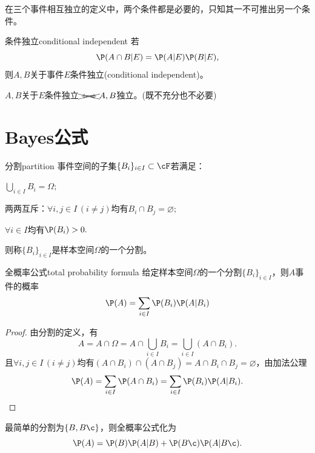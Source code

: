 \begin{remark}
	在三个事件相互独立的定义中，两个条件都是必要的，只知其一不可推出另一个条件。
\end{remark}


\begin{definition}{条件独立}{conditional independent}
	若
	\[
		\P(A\cap B|E)=\P(A|E)\P(B|E),
	\]
	则$A,B$关于事件$E$条件独立(conditional independent)。
\end{definition}

\begin{remark}
	$A,B$关于$E$条件独立$\xcancel{\iff}A,B$独立。(既不充分也不必要)
\end{remark}

\section{Bayes公式}

\begin{definition}
	{分割}{partition}
	事件空间的子集$\{B_i\}_{i\in I}\subset\cF$若满足：
	\begin{compactenum}
		\item $\bigcup\nolimits_{i\in I} B_i=\Omega;$
		\item 两两互斥：$\forall i,j\in I\,(i\neq j)$均有$B_i\cap B_j=\varnothing;$
		\item $\forall i\in I$均有$\P(B_i)>0.$
	\end{compactenum}
	则称$\{B_i\}_{i\in I}$是样本空间$\Omega$的一个分割。
\end{definition}

\begin{theorem}{全概率公式}{total probability formula}
	给定样本空间$\Omega$的一个分割$\{B_i\}_{i\in I}$，则$A$事件的概率
	\begin{equation}
		\P(A)=\sum_{i\in I}\P(B_i)\P(A|B_i)
	\end{equation}
\end{theorem}

\begin{proof}
	由分割的定义，有
	\[
		A=A\cap\Omega=A\cap\bigcup_{i\in I}B_i=\bigcup_{i\in I}(A\cap B_i).
	\]
	且$\forall i,j\in I\,(i\neq j)$均有$(A\cap B_i)\cap(A\cap B_j)=A\cap B_i\cap B_j=\varnothing$，由加法公理
	\[
		\P(A)=\sum_{i\in I}\P(A\cap B_i)=\sum_{i\in I}\P(B_i)\P(A|B_i).
		\qedhere
	\]
\end{proof}

\begin{corollary}
	最简单的分割为$\{B,B\c\}$，则全概率公式化为
	\[
		\P(A)=\P(B)\P(A|B)+\P(B\c)\P(A|B\c).
	\]
\end{corollary}

